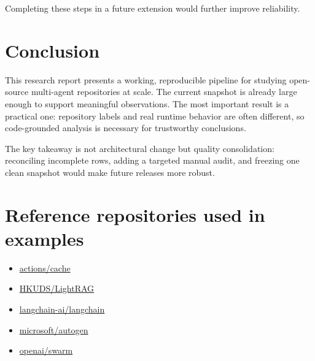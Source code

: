 \documentclass[12pt,a4paper,onecolumn]{article}
\begin{document}
Completing these steps in a future extension would further improve reliability.

\section{Conclusion}
This research report presents a working, reproducible pipeline for studying open-source multi-agent repositories at scale. The current snapshot is already large enough to support meaningful observations. The most important result is a practical one: repository labels and real runtime behavior are often different, so code-grounded analysis is necessary for trustworthy conclusions.

The key takeaway is not architectural change but quality consolidation: reconciling incomplete rows, adding a targeted manual audit, and freezing one clean snapshot would make future releases more robust.

\appendix
\section{Reference repositories used in examples}
\begin{itemize}
  \item \href{https://github.com/actions/cache}{actions/cache}
  \item \href{https://github.com/HKUDS/LightRAG}{HKUDS/LightRAG}
  \item \href{https://github.com/langchain-ai/langchain}{langchain-ai/langchain}
  \item \href{https://github.com/microsoft/autogen}{microsoft/autogen}
  \item \href{https://github.com/openai/swarm}{openai/swarm}
\end{itemize}
\end{document}

